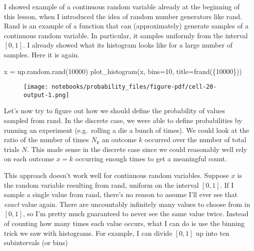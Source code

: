 \documentclass[
  letterpaper,
  DIV=11,
  numbers=noendperiod]{scrreprt}
\newenvironment{Shaded}{\begin{snugshade}}{\end{snugshade}}
\newcommand{\DecValTok}[1]{\textcolor[rgb]{0.68,0.00,0.00}{#1}}
\newcommand{\NormalTok}[1]{\textcolor[rgb]{0.00,0.23,0.31}{#1}}
\newcommand{\OperatorTok}[1]{\textcolor[rgb]{0.37,0.37,0.37}{#1}}
\newcommand{\SpecialCharTok}[1]{\textcolor[rgb]{0.37,0.37,0.37}{#1}}
\newcommand{\SpecialStringTok}[1]{\textcolor[rgb]{0.13,0.47,0.30}{#1}}
\begin{document}
I showed example of a continuous random variable already at the
beginning of this lesson, when I introduced the idea of random number
generators like rand. Rand is an example of a function that can
(approximately) generate samples of a continuous random variable. In
particular, it samples uniformly from the interval \([0,1]\). I already
showed what its histogram looks like for a large number of samples. Here
it is again.

\begin{Shaded}
\begin{Highlighting}[]
\NormalTok{x }\OperatorTok{=}\NormalTok{ np.random.rand(}\DecValTok{10000}\NormalTok{)}
\NormalTok{plot\_histogram(x, bins}\OperatorTok{=}\DecValTok{10}\NormalTok{, title}\OperatorTok{=}\SpecialStringTok{f\textquotesingle{}rand(}\SpecialCharTok{\{}\DecValTok{10000}\SpecialCharTok{\}}\SpecialStringTok{)\textquotesingle{}}\NormalTok{)}
\end{Highlighting}
\end{Shaded}

\begin{figure}[H]

{\centering \texttt{[image: notebooks/probability\_files/figure-pdf/cell-20-output-1.png]}

}

\end{figure}

Let's now try to figure out how we should define the probability of
values sampled from rand. In the discrete case, we were able to define
probabilities by running an experiment (e.g.~rolling a die a bunch of
times). We could look at the ratio of the number of times \(N_k\) an
outcome \(k\) occurred over the number of total trials \(N\). This made
sense in the discrete case since we could reasonably well rely on each
outcome \(x=k\) occurring enough times to get a meaningful count.

This approach doesn't work well for continuous random variables. Suppose
\(x\) is the random variable resulting from rand, uniform on the
interval \([0,1]\). If I sample a single value from rand, there's no
reason to assume I'll ever see that \emph{exact} value again. There are
uncountably infinitely many values to choose from in \([0,1]\), so I'm
pretty much guaranteed to never see the same value twice. Instead of
counting how many times each value occurs, what I can do is use the
binning trick we saw with histograms. For example, I can divide
\([0,1]\) up into ten subintervals (or bins)
\end{document}
